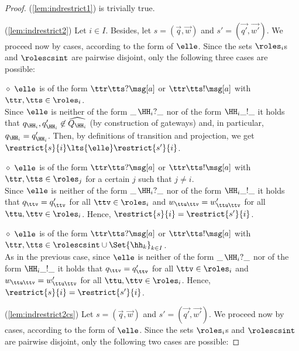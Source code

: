 \begin{proof}
(\ref{lem:indrestrict1}) is trivially true.


\noindent
(\ref{lem:indrestrict2}) Let $i\in I$. Besides, let $s = (\vec{q},\vec{w})$ and
$s' = (\vec{q'},\vec{w'})$.  We proceed now by cases, according to the form of
$\elle$. Since the sets $\roles_i$s and $\rolescsint$ are pairwise disjoint,
only the following three cases are possible:

\begin{description}
\item
\underline{$\diamond$}
$\elle$ is of the form $\ttr\tts?\msg[a]$ or $\ttr\tts!\msg[a]$
with $\ttr,\tts \in \roles_i$.\\ 
Since $\elle$ is neither of the form $\_\,\HH_i?\_$ nor of the form $\HH_i\_!\_$
it holds that   
$q_{\HH_i},  q'_{\HH_i} \not\in \widehat{Q_{\HH_i}}$ (by construction of gateways) and, in particular, 
$q_{\HH_i} = q'_{\HH_i}$.
Then, by definitions of transition and projection, we get $\restrict{s}{i}\lts{\elle}\restrict{s'}{i}$.

\item
\underline{$\diamond$}
$\elle$ is of the form $\ttr\tts?\msg[a]$ or $\ttr\tts!\msg[a]$
with $\ttr,\tts \in \roles_j$ for a certain  $j$ such that $j \neq i$.\\
Since $\elle$ is neither of the form $\_\,\HH_i?\_$ nor of the form $\HH_i\_!\_$
it holds that $q_\ttv = q'_\ttv$ for all $\ttv \in \roles_i$
and $w_{\ttu\ttv} = w'_{\ttu\ttv}$ for all $\ttu,\ttv \in \roles_i$.
Hence, $\restrict{s}{i}=\restrict{s'}{i}$.
\item
\underline{$\diamond$}
 $\elle$ is of the form $\ttr\tts?\msg[a]$ or $\ttr\tts!\msg[a]$
with $\ttr,\tts \in \rolescsint\cup\Set{\hh_k}_{k\in I}$. \\ 
As in the previous case, 
since $\elle$ is neither of the form $\_\,\HH_i?\_$ nor of the form $\HH_i\_!\_$
it holds that $q_\ttv = q'_\ttv$ for all $\ttv \in \roles_i$
and $w_{\ttu\ttv} = w'_{\ttu\ttv}$ for all $\ttu,\ttv \in \roles_i$.
Hence, $\restrict{s}{i}=\restrict{s'}{i}$.

\end{description}
%
%
\noindent
(\ref{lem:indrestrict2cs}) 
Let $s = (\vec{q},\vec{w})$ and
$s' = (\vec{q'},\vec{w'})$.  We proceed now by cases, according to the form of
$\elle$. Since the sets $\roles_i$s and $\rolescsint$ are pairwise disjoint,
only the following two cases are possible:


\end{proof}
